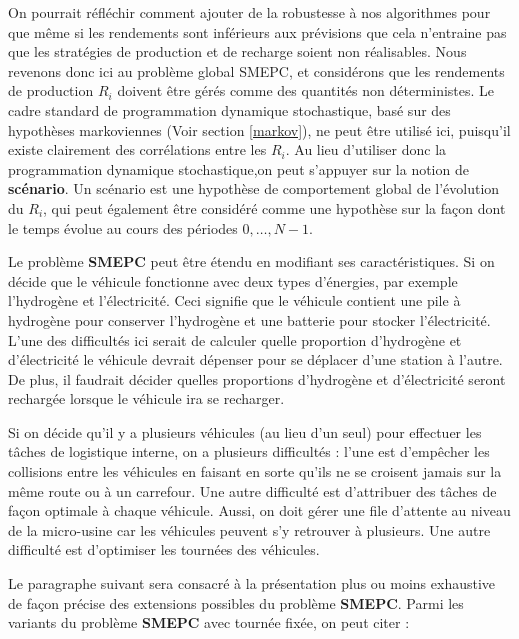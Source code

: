 	On pourrait réfléchir comment ajouter de la robustesse à nos algorithmes pour que même si les rendements sont inférieurs aux prévisions que cela n'entraine pas que les stratégies de production et de recharge soient non réalisables. Nous revenons donc ici au problème global SMEPC, et considérons que les rendements de production $R_i$ doivent être gérés comme des quantités non déterministes. Le cadre standard de programmation dynamique stochastique, basé sur des hypothèses markoviennes (Voir section \ref{markov}), ne peut être utilisé ici, puisqu'il existe clairement des corrélations entre les $R_i$. Au lieu d'utiliser donc la programmation dynamique stochastique,on peut s'appuyer sur la notion de \textbf{scénario}.  Un scénario est une hypothèse de comportement global de l'évolution du $R_i$, qui peut également être considéré comme une hypothèse sur la façon dont le temps évolue au cours des périodes $0, \dots, N-1$.
	
	Le problème \textbf{SMEPC} peut être étendu en modifiant ses caractéristiques. Si on décide que le véhicule fonctionne avec deux types d'énergies, par exemple l'hydrogène et l'électricité. Ceci signifie que le véhicule contient une pile à hydrogène pour conserver l'hydrogène et une batterie pour stocker l'électricité. L'une des difficultés ici serait de calculer quelle proportion d'hydrogène et d'électricité le véhicule devrait dépenser pour se déplacer d'une station à l'autre. De plus, il faudrait décider quelles proportions d'hydrogène et d'électricité seront rechargée lorsque le véhicule ira se recharger.
	
	Si on décide qu'il y a plusieurs véhicules (au lieu d'un seul) pour effectuer les tâches de logistique interne, on a plusieurs difficultés : l'une est d'empêcher les collisions entre les véhicules en faisant en sorte qu'ils ne se croisent jamais sur la même route ou à un carrefour. Une autre difficulté est d'attribuer des tâches de façon optimale à chaque véhicule. Aussi, on doit gérer une file d'attente au niveau de la micro-usine car les véhicules peuvent s'y retrouver à plusieurs. Une autre difficulté est d'optimiser les tournées des véhicules.
	
	
	 Le paragraphe suivant sera consacré à la présentation plus ou moins exhaustive de façon précise des extensions possibles du problème \textbf{SMEPC}. 
	Parmi les variants du problème \textbf{SMEPC} avec tournée fixée, on peut citer :
	

